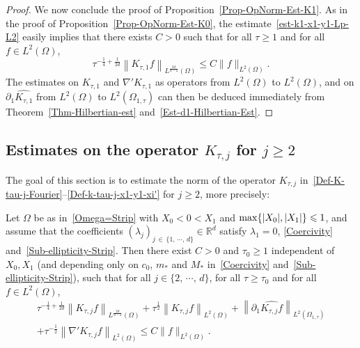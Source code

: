 \documentclass[10pt]{amsart}
\theoremstyle{definition}\newtheorem{defi}[theo]{Definition}\newtheorem{rema}[theo]{Remark}\newtheorem{exam}[theo]{Example}\newtheorem{exem}[theo]{Example}\newtheorem{nota}[theo]{Notation}
\newcommand*\R{\mathbb{R}}
\renewcommand{\leq}{\leqslant}
\renewcommand{\geq}{\geqslant}
\begin{document}
\begin{proof}
We now conclude the proof of Proposition~\ref{Prop-OpNorm-Est-K1}. As in the proof of Proposition~\ref{Prop-OpNorm-Est-K0}, the estimate~\eqref{est-k1-x1-y1-Lp-L2} easily implies that there exists $C>0$ such that for all $\tau \geq 1$ and for all $f \in L^2(\Omega)$,
\begin{equation*}
\tau^{-\frac{1}{4}+\frac{1}{2d}} \left\| K_{\tau,1} f\right\|_{L^{\frac{2d}{d-2}}(\Omega)}
\leq C \| f \|_{L^2(\Omega)}.
\end{equation*}
The estimates on $K_{\tau,1}$ and $\nabla' K_{\tau,1}$ as operators from $L^2(\Omega)$ to $L^2(\Omega)$, and on $\partial_1\widehat { K_{\tau,1}}$ from $L^2(\Omega)$ to $L^2(\Omega_{1, \tau})$ can then be deduced immediately from Theorem~\ref{Thm-Hilbertian-est} and~\eqref{Est-d1-Hilbertian-Est}.
\end{proof}

\subsection{Estimates on the operator \texorpdfstring{$K_{\tau,j}$}{K tau,j} for \texorpdfstring{$j \geq 2$}{j >= 2}}


The goal of this section is to estimate the norm of the operator $K_{\tau, j}$ in~\eqref{Def-K-tau-j-Fourier}--\eqref{Def-k-tau-j-x1-y1-xi'} for $j \geq 2$, more precisely:

\begin{prop}\label{Prop-OpNorm-Est-Kj}
Let $\Omega$ be as in~\eqref{Omega=Strip} with $X_0 \! <\! 0\! <\! X_1$ and $\max\{|X_0|, |X_1| \}\linebreak \leq 1$, and assume that the coefficients $(\lambda_j)_{j\,\in\,\{1,\,\cdots,\,d\}} \in \R^d$ satisfy $\lambda_1 = 0$, \eqref{Coercivity} and~\eqref{Sub-ellipticity-Strip}. Then there exist $C>0$ and $\tau_0 \geq 1$ independent of $X_0, X_1$ (and depending only on $c_0$, $m_*$ and $M_*$ in~\eqref{Coercivity} and~\eqref{Sub-ellipticity-Strip}), such that for all $j \in \{2,\,\cdots,\,d\}$, for all $\tau \geq \tau_0$ and for all $f \in L^2(\Omega)$,
\begin{multline*}
\tau^{-\frac{1}{4}+\frac{1}{2d}} \left\| K_{\tau,j} f\right\|_{L^{\frac{2d}{d-2}}(\Omega)} +
\tau^{\frac{1}{2}}\left\| K_{\tau,j} f\right\|_{L^{2}(\Omega)} +
\left\| \partial_1 \widehat{ K_{\tau,j} f}\right\|_{L^2(\Omega_{1, \tau})} \\ +
\tau^{-\frac{1}{2}} \left\| \nabla' K_{\tau,j} f\right\|_{L^2(\Omega)}
\leq C \| f \|_{L^2(\Omega)}.
\end{multline*}
\end{prop}
\end{document}

